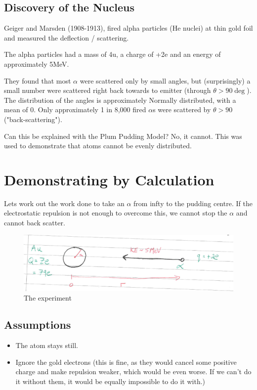 \subsection*{Discovery of the Nucleus}
Geiger and Marsden (1908-1913), fired alpha particles (He nuclei) at thin gold foil and measured the deflection / scattering.

The alpha particles had a mass of 4u, a charge of +2e and an energy of approximately 5MeV.

They found that most $\alpha$ were scattered only by small angles, but (surprisingly) a small number were scattered right back towards to emitter (through $\theta > 90\deg$). The distribution of the angles is approximately Normally distributed, with a mean of 0. Only approximately 1 in 8,000 fired $\alpha$s were scattered by $\theta>90$ ("back-scattering").

Can this be explained with the Plum Pudding Model? No, it cannot. This was used to demonstrate that atoms cannot be evenly distributed.

\section*{Demonstrating by Calculation}
Lets work out the work done to take an $\alpha$ from infty to the pudding centre. If the electrostatic repulsion is not enough to overcome this, we cannot stop the $\alpha$ and cannot back scatter.

\begin{figure}[H]
    \centering
    \includegraphics{figures/scattering.png}
     \caption{The experiment}
\end{figure}

\subsection*{Assumptions}
\begin{itemize}
    \item The atom stays still.
    \item Ignore the gold electrons (this is fine, as they would cancel some positive charge and make repulsion weaker, which would be even worse. If we can't do it without them, it would be equally impossible to do it with.)
\end{itemize}

